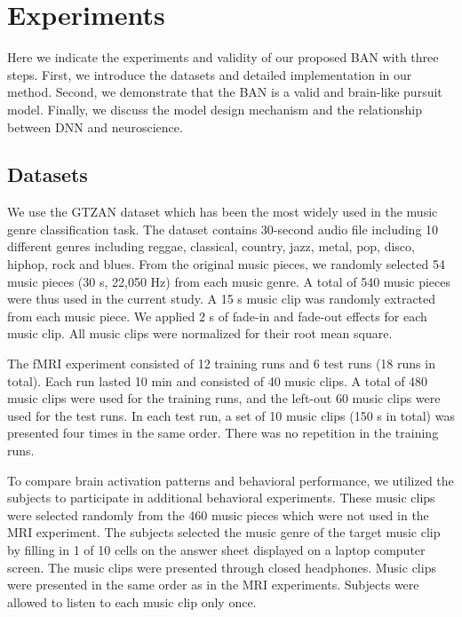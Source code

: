 \documentclass[journal]{IEEEtran}
\begin{document}
\section{Experiments} \label{sec:experiments}
Here we indicate the experiments and validity of our proposed BAN with three steps. 
First, we introduce the datasets and detailed implementation in our method.
Second, we demonstrate that the BAN is a valid and brain-like pursuit model.
Finally, we discuss the model design mechanism and the relationship between DNN and neuroscience. 


\subsection{Datasets} \label{sec:datasets}

We use the GTZAN dataset which has been the most widely used in the music genre classification task.
The dataset contains 30-second audio file including 10 different genres including reggae, classical, country, jazz, metal, pop, disco, hiphop, rock and blues.
From the original music pieces, we randomly selected 54 music pieces (30 s, 22,050 Hz) from each music genre. 
A total of 540 music pieces were thus used in the current study. 
A 15 s music clip was randomly extracted from each music piece.
We applied 2 s of fade-in and fade-out effects for each music clip. 
All music clips were normalized for their root mean square.


The fMRI experiment consisted of 12 training runs and 6 test runs (18 runs in total). 
Each run lasted 10 min and consisted of 40 music clips.
A total of 480 music clips were used for the training runs, and the left-out 60 music clips were used for the test runs. 
In each test run, a set of 10 music clips (150 s in total) was presented four times in the same order. 
There was no repetition in the training runs.


To compare brain activation patterns and behavioral performance, we utilized the subjects to participate in additional behavioral experiments. 
These music clips were selected randomly from the 460 music pieces which were not used in the MRI experiment. 
The subjects selected the music genre of the target music clip by filling in 1 of 10 cells on the answer sheet displayed on a laptop computer screen. 
The music clips were presented through closed headphones. 
Music clips were presented in the same order as in the MRI experiments. 
Subjects were allowed to listen to each music clip only once.
\end{document}
